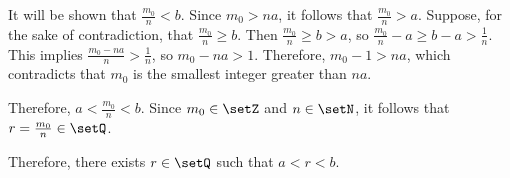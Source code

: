 \begin{enumerate}
\begin{subprove}
      It will be shown that \(\frac{m_0}{n} < b\).
      Since \(m_0 > na\), it follows that \(\frac{m_0}{n} > a\).
      Suppose, for the sake of contradiction, that \(\frac{m_0}{n} \ge b\).
      Then \(\frac{m_0}{n} \ge b > a\), so \(\frac{m_0}{n} - a \ge b - a > \frac{1}{n}\).
      This implies \(\frac{m_0 - na}{n} > \frac{1}{n}\), so \(m_0 - na > 1\).
      Therefore, \(m_0 - 1 > na\), which contradicts that \(m_0\) is the smallest integer greater than \(na\).
      
      Therefore, \(a < \frac{m_0}{n} < b\).
      Since \(m_0 \in \setZ\) and \(n \in \setN\), it follows that \(r = \frac{m_0}{n} \in \setQ\).
      
      Therefore, there exists \(r \in \setQ\) such that \(a < r < b\).
    \end{subprove}
\end{enumerate}




























